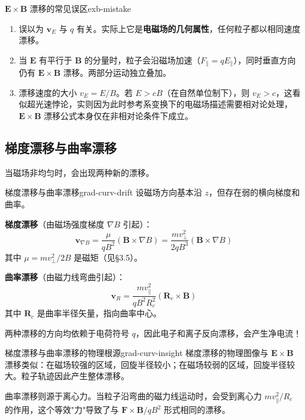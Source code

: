 \documentclass[12pt,a4paper,openany,oneside]{book}
\newcommand{\vect}[1]{\bm{#1}}
\newcommand{\grad}{\nabla}
\begin{document}
\begin{warning}{$\vect{E}\times\vect{B}$ 漂移的常见误区}{exb-mistake}
\begin{enumerate}
\item 误以为 $\vect{v}_E$ 与 $q$ 有关。实际上它是\textbf{电磁场的几何属性}，任何粒子都以相同速度漂移。
\item 当 $\vect{E}$ 有平行于 $\vect{B}$ 的分量时，粒子会沿磁场加速（$F_\parallel = qE_\parallel$），同时垂直方向仍有 $\vect{E}\times\vect{B}$ 漂移。两部分运动独立叠加。
\item 漂移速度的大小 $v_E = E/B$。若 $E > cB$（在自然单位制下），则 $v_E > c$，这看似超光速悖论，实则因为此时参考系变换下的电磁场描述需要相对论处理，$\vect{E}\times\vect{B}$ 漂移公式本身仅在非相对论条件下成立。
\end{enumerate}
\end{warning}

\subsection{梯度漂移与曲率漂移}

当磁场非均匀时，会出现两种新的漂移。

\begin{theorem}{梯度漂移与曲率漂移}{grad-curv-drift}
设磁场方向基本沿 $z$，但存在弱的横向梯度和曲率。

\textbf{梯度漂移}（由磁场强度梯度 $\grad B$ 引起）：
\[
\vect{v}_{\nabla B} = \frac{\mu}{qB^2}(\vect{B}\times\grad B) = \frac{m v_\perp^2}{2qB^3}(\vect{B}\times\grad B)
\]
其中 $\mu = mv_\perp^2/2B$ 是磁矩（见\S3.5）。

\textbf{曲率漂移}（由磁力线弯曲引起）：
\[
\vect{v}_R = \frac{m v_\parallel^2}{qB^2 R_c^2}(\vect{R}_c\times\vect{B})
\]
其中 $\vect{R}_c$ 是曲率半径矢量，指向曲率中心。

两种漂移的方向均依赖于电荷符号 $q$，因此电子和离子反向漂移，会产生净电流！
\end{theorem}

\begin{insight}{梯度漂移与曲率漂移的物理根源}{grad-curv-insight}
梯度漂移的物理图像与 $\vect{E}\times\vect{B}$ 漂移类似：在磁场较强的区域，回旋半径较小；在磁场较弱的区域，回旋半径较大。粒子轨迹因此产生整体漂移。

曲率漂移则源于离心力。当粒子沿弯曲的磁力线运动时，会受到离心力 $m v_\parallel^2/R_c$ 的作用，这个等效"力"导致了与 $\vect{F}\times\vect{B}/qB^2$ 形式相同的漂移。
\end{insight}
\end{document}
